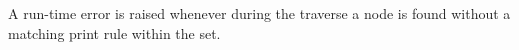 \noindent
A run-time error is raised whenever during the traverse a node
is found without a matching print rule within the set.

\begin{grammar}
      \produces {}  
	 \lextoken{\{} 
	 \lextoken{\}} \\
\end{grammar}

\endinput
